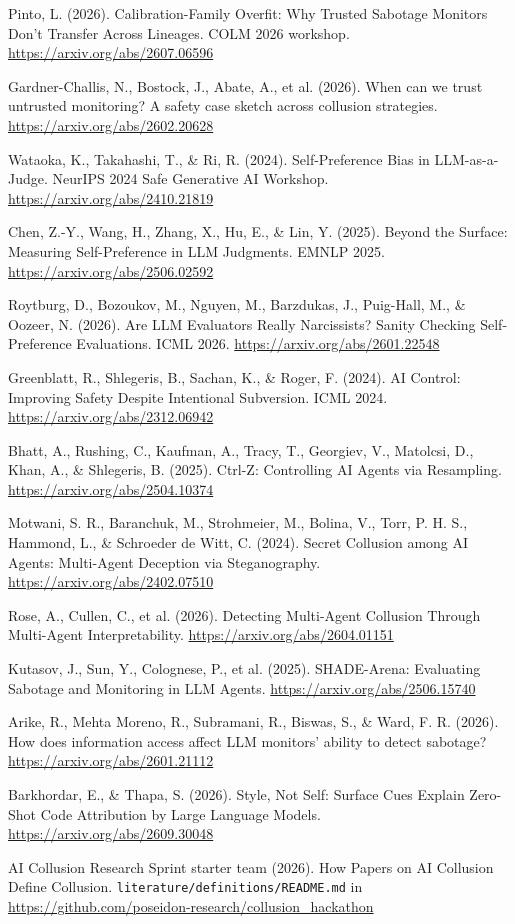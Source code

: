 \documentclass[11pt,letterpaper]{article}
\begin{document}
\begin{enumerate}[label={[\arabic*]},leftmargin=2.2em,itemsep=1pt]
\item Pinto, L. (2026). Calibration-Family Overfit: Why Trusted Sabotage Monitors Don't Transfer Across Lineages. COLM 2026 workshop. \url{https://arxiv.org/abs/2607.06596}
\item Gardner-Challis, N., Bostock, J., Abate, A., et al. (2026). When can we trust untrusted monitoring? A safety case sketch across collusion strategies. \url{https://arxiv.org/abs/2602.20628}
\item Wataoka, K., Takahashi, T., \& Ri, R. (2024). Self-Preference Bias in LLM-as-a-Judge. NeurIPS 2024 Safe Generative AI Workshop. \url{https://arxiv.org/abs/2410.21819}
\item Chen, Z.-Y., Wang, H., Zhang, X., Hu, E., \& Lin, Y. (2025). Beyond the Surface: Measuring Self-Preference in LLM Judgments. EMNLP 2025. \url{https://arxiv.org/abs/2506.02592}
\item Roytburg, D., Bozoukov, M., Nguyen, M., Barzdukas, J., Puig-Hall, M., \& Oozeer, N. (2026). Are LLM Evaluators Really Narcissists? Sanity Checking Self-Preference Evaluations. ICML 2026. \url{https://arxiv.org/abs/2601.22548}
\item Greenblatt, R., Shlegeris, B., Sachan, K., \& Roger, F. (2024). AI Control: Improving Safety Despite Intentional Subversion. ICML 2024. \url{https://arxiv.org/abs/2312.06942}
\item Bhatt, A., Rushing, C., Kaufman, A., Tracy, T., Georgiev, V., Matolcsi, D., Khan, A., \& Shlegeris, B. (2025). Ctrl-Z: Controlling AI Agents via Resampling. \url{https://arxiv.org/abs/2504.10374}
\item Motwani, S. R., Baranchuk, M., Strohmeier, M., Bolina, V., Torr, P. H. S., Hammond, L., \& Schroeder de Witt, C. (2024). Secret Collusion among AI Agents: Multi-Agent Deception via Steganography. \url{https://arxiv.org/abs/2402.07510}
\item Rose, A., Cullen, C., et al. (2026). Detecting Multi-Agent Collusion Through Multi-Agent Interpretability. \url{https://arxiv.org/abs/2604.01151}
\item Kutasov, J., Sun, Y., Colognese, P., et al. (2025). SHADE-Arena: Evaluating Sabotage and Monitoring in LLM Agents. \url{https://arxiv.org/abs/2506.15740}
\item Arike, R., Mehta Moreno, R., Subramani, R., Biswas, S., \& Ward, F. R. (2026). How does information access affect LLM monitors' ability to detect sabotage? \url{https://arxiv.org/abs/2601.21112}
\item Barkhordar, E., \& Thapa, S. (2026). Style, Not Self: Surface Cues Explain Zero-Shot Code Attribution by Large Language Models. \url{https://arxiv.org/abs/2609.30048}
\item AI Collusion Research Sprint starter team (2026). How Papers on AI Collusion Define Collusion. \texttt{literature/definitions/README.md} in \url{https://github.com/poseidon-research/collusion_hackathon}
\end{enumerate}
\normalsize
\end{document}
